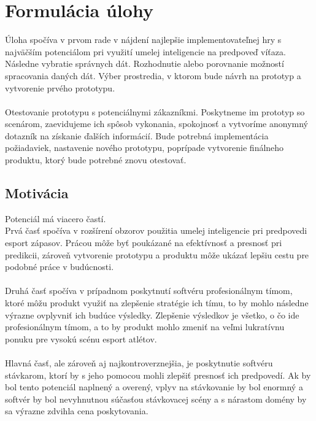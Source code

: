 \section*{Formulácia úlohy}

Úloha spočíva v prvom rade v nájdení najlepšie implementovateľnej hry s najväčším potenciálom pri využití umelej inteligencie na predpoveď víťaza. Následne vybratie správnych dát. 
Rozhodnutie alebo porovnanie možností spracovania daných dát. Výber prostredia, v ktorom bude návrh na prototyp a vytvorenie prvého prototypu. 
\\ \\
Otestovanie prototypu s potenciálnymi zákazníkmi. Poskytneme im prototyp so scenárom, zaevidujeme ich spôsob vykonania, spokojnosť a vytvoríme anonymný dotazník na získanie ďalších informácií. Bude potrebná implementácia požiadaviek, nastavenie nového prototypu, poprípade vytvorenie finálneho produktu, ktorý bude potrebné znovu otestovať. 

\subsection*{Motivácia}

Potenciál má viacero častí.\\
Prvá časť spočíva v rozšírení obzorov použitia umelej inteligencie pri predpovedi esport zápasov. Prácou môže byť poukázané na efektívnosť a presnosť pri predikcii, zároveň vytvorenie prototypu a produktu môže ukázať lepšiu cestu pre podobné práce v budúcnosti.
\\ \\
Druhá časť spočíva v prípadnom poskytnutí softvéru profesionálnym tímom, ktoré môžu produkt využiť na zlepšenie stratégie ich tímu, to by mohlo následne výrazne ovplyvniť ich budúce výsledky. Zlepšenie výsledkov je všetko, o čo ide profesionálnym tímom, a to by produkt mohlo zmeniť na veľmi lukratívnu ponuku pre vysokú scénu esport atlétov.
\\ \\
Hlavná časť, ale zároveň aj najkontroverznejšia, je poskytnutie softvéru stávkarom, ktorí by s jeho pomocou mohli zlepšiť presnosť ich predpovedí. Ak by bol tento potenciál naplnený a overený, vplyv na stávkovanie by bol enormný a softvér by bol nevyhnutnou súčasťou stávkovacej scény a s nárastom domény by sa výrazne zdvihla cena poskytovania.






